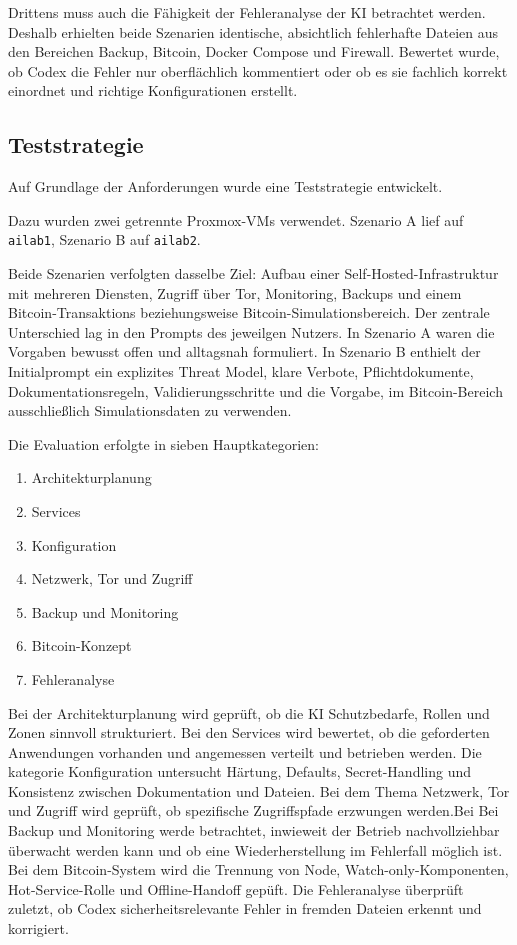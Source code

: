 Drittens muss auch die Fähigkeit der Fehleranalyse der \acs{KI} betrachtet werden. Deshalb erhielten beide Szenarien identische, absichtlich fehlerhafte Dateien aus den Bereichen Backup, Bitcoin, Docker Compose und Firewall. Bewertet wurde, ob Codex die Fehler nur oberflächlich kommentiert oder ob es sie fachlich korrekt einordnet und richtige Konfigurationen erstellt.


\subsection{Teststrategie}

Auf Grundlage der Anforderungen wurde eine Teststrategie entwickelt.

Dazu wurden zwei getrennte Proxmox-\acs{VM}s verwendet. Szenario A lief auf \texttt{ailab1}, Szenario B auf \texttt{ailab2}.

Beide Szenarien verfolgten dasselbe Ziel: Aufbau einer Self-Hosted-Infrastruktur mit mehreren Diensten, Zugriff über Tor, Monitoring, Backups und einem Bitcoin-Transaktions beziehungsweise Bitcoin-Simulationsbereich. Der zentrale Unterschied lag in den Prompts des jeweilgen Nutzers. In Szenario A waren die Vorgaben bewusst offen und alltagsnah formuliert. In Szenario B enthielt der Initialprompt ein explizites Threat Model, klare Verbote, Pflichtdokumente, Dokumentationsregeln, Validierungsschritte und die Vorgabe, im Bitcoin-Bereich ausschließlich Simulationsdaten zu verwenden.

Die Evaluation erfolgte in sieben Hauptkategorien:

\begin{enumerate}
\item Architekturplanung
\item Services
\item Konfiguration
\item Netzwerk, Tor und Zugriff
\item Backup und Monitoring
\item Bitcoin-Konzept
\item Fehleranalyse
\end{enumerate}

Bei der Architekturplanung wird geprüft, ob die \acs{KI} Schutzbedarfe, Rollen und Zonen sinnvoll strukturiert. Bei den Services wird bewertet, ob die geforderten Anwendungen vorhanden und angemessen verteilt und betrieben werden. Die kategorie Konfiguration untersucht Härtung, Defaults, Secret-Handling und Konsistenz zwischen Dokumentation und Dateien. Bei dem Thema Netzwerk, Tor und Zugriff wird geprüft, ob spezifische Zugriffspfade erzwungen werden.Bei Bei Backup und Monitoring werde betrachtet, inwieweit der Betrieb nachvollziehbar überwacht werden kann und ob eine Wiederherstellung im Fehlerfall möglich ist. Bei dem Bitcoin-System wird die Trennung von Node, Watch-only-Komponenten, Hot-Service-Rolle und Offline-Handoff gepüft. Die Fehleranalyse überprüft zuletzt, ob Codex sicherheitsrelevante Fehler in fremden Dateien erkennt und korrigiert.

